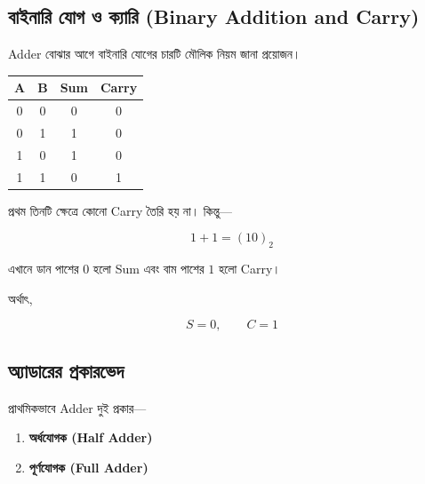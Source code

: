 
\subsection{বাইনারি যোগ ও ক্যারি
(\textenglish{Binary Addition and Carry})}

\textenglish{Adder} বোঝার আগে বাইনারি যোগের চারটি মৌলিক নিয়ম জানা প্রয়োজন।

\begin{center}
\begin{tabular}{|c|c|c|c|}
\hline

\rowcolor{ICTLightBlue}

\(\mathbf A\)
&
\(\mathbf B\)
&
\textbf{\textenglish{Sum}}
&
\textbf{\textenglish{Carry}}
\\

\hline
0&0&0&0\\
\hline

0&1&1&0\\
\hline

1&0&1&0\\
\hline

1&1&0&1\\
\hline

\end{tabular}
\end{center}

প্রথম তিনটি ক্ষেত্রে কোনো \textenglish{Carry} তৈরি হয় না। কিন্তু—

\[
1+1=(10)_2
\]

এখানে ডান পাশের \(0\) হলো \textenglish{Sum}
এবং বাম পাশের \(1\) হলো \textenglish{Carry}।

অর্থাৎ,

\[
S=0,
\qquad
C=1
\]



\subsection{অ্যাডারের প্রকারভেদ}

প্রাথমিকভাবে \textenglish{Adder} দুই প্রকার—

\begin{enumerate}[leftmargin=*,itemsep=2pt]

\item
\textbf{অর্ধযোগক (\textenglish{Half Adder})}

\item
\textbf{পূর্ণযোগক (\textenglish{Full Adder})}

\end{enumerate}

